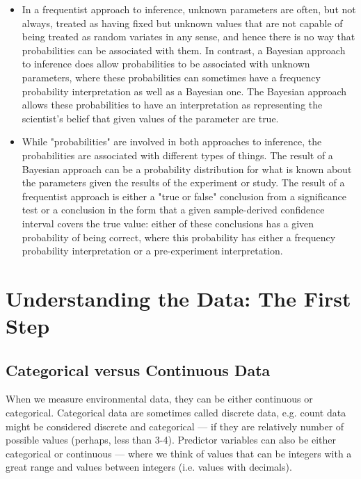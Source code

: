 \documentclass{article}\usepackage[]{graphicx}\usepackage[]{color}
\begin{document}
\begin{itemize}
  \item In a frequentist approach to inference, unknown parameters are often, but not always, treated as having fixed but unknown values that are not capable of being treated as random variates in any sense, and hence there is no way that probabilities can be associated with them. In contrast, a Bayesian approach to inference does allow probabilities to be associated with unknown parameters, where these probabilities can sometimes have a frequency probability interpretation as well as a Bayesian one. The Bayesian approach allows these probabilities to have an interpretation as representing the scientist's belief that given values of the parameter are true.

  \item While "probabilities" are involved in both approaches to inference, the probabilities are associated with different types of things. The result of a Bayesian approach can be a probability distribution for what is known about the parameters given the results of the experiment or study. The result of a frequentist approach is either a "true or false" conclusion from a significance test or a conclusion in the form that a given sample-derived confidence interval covers the true value: either of these conclusions has a given probability of being correct, where this probability has either a frequency probability interpretation or a pre-experiment interpretation.

\end{itemize}

\section{Understanding the Data: The First Step}

\subsection{Categorical versus Continuous Data}

When we measure environmental data, they can be either continuous or categorical. Categorical data are sometimes called discrete data, e.g. count data might be considered discrete and categorical --- if they are relatively number of possible values (perhaps, less than 3-4). Predictor variables can also be either categorical or continuous --- where we think of values that can be integers with a great range and values between integers (i.e. values with decimals).
\end{document}
